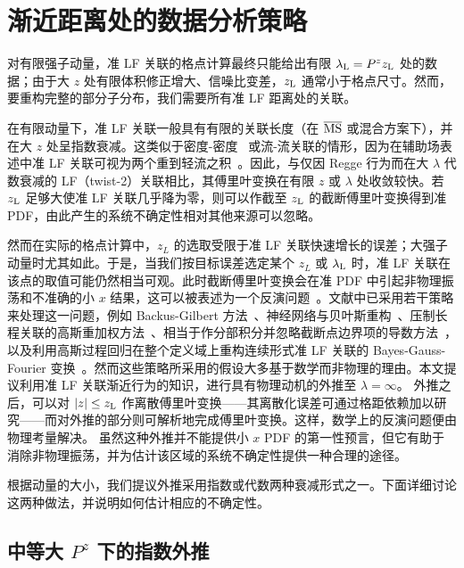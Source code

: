 \section{渐近距离处的数据分析策略}
\label{sec:regge}

对有限强子动量，准 LF 关联的格点计算最终只能给出有限 $\lambda_{\rm L}=P^zz_{\rm L}$ 处的数据；由于大 $z$ 处有限体积修正增大、信噪比变差，$z_{\rm L}$ 通常小于格点尺寸。然而，要重构完整的部分子分布，我们需要所有准 LF 距离处的关联。

在有限动量下，准 LF 关联一般具有有限的关联长度（在 ${\overline{\rm MS}}$ 或混合方案下），并在大 $z$ 处呈指数衰减。这类似于密度-密度~\cite{Burkardt:1994pw} 或流-流关联的情形，因为在辅助场表述中准 LF 关联可视为两个重到轻流之积~\cite{Samuel:1978iy,Gervais:1979fv,Arefeva:1980zd,Dorn:1986dt}。因此，与仅因 Regge 行为而在大 $\lambda$ 代数衰减的 LF（twist-2）关联相比，其傅里叶变换在有限 $z$ 或 $\lambda$ 处收敛较快。若 $z_{\rm L}$ 足够大使准 LF 关联几乎降为零，则可以作截至 $z_{\rm L}$ 的截断傅里叶变换得到准 PDF，由此产生的系统不确定性相对其他来源可以忽略。

然而在实际的格点计算中，$z_L$ 的选取受限于准 LF 关联快速增长的误差；大强子动量时尤其如此。于是，当我们按目标误差选定某个 $z_L$ 或 $\lambda_{\rm L}$ 时，准 LF 关联在该点的取值可能仍然相当可观。此时截断傅里叶变换会在准 PDF 中引起非物理振荡和不准确的小 $x$ 结果，这可以被表述为一个反演问题~\cite{Karpie:2019eiq}。文献中已采用若干策略来处理这一问题，例如 Backus-Gilbert 方法~\cite{Karpie:2019eiq,Bhat:2020ktg}、神经网络与贝叶斯重构~\cite{Karpie:2019eiq}、压制长程关联的高斯重加权方法~\cite{Ishikawa:2019flg}、相当于作分部积分并忽略截断点边界项的导数方法~\cite{Lin:2017ani}，以及利用高斯过程回归在整个定义域上重构连续形式准 LF 关联的 Bayes-Gauss-Fourier 变换~\cite{Alexandrou:2020tqq}。然而这些策略所采用的假设大多基于数学而非物理的理由。本文提议利用准 LF 关联渐近行为的知识，进行具有物理动机的外推至 $\lambda\!=\!\infty$。
外推之后，可以对 $|z|\le z_{\rm L}$ 作离散傅里叶变换——其离散化误差可通过格距依赖加以研究——而对外推的部分则可解析地完成傅里叶变换。这样，数学上的反演问题便由物理考量解决。
虽然这种外推并不能提供小 $x$ PDF 的第一性预言，但它有助于消除非物理振荡，并为估计该区域的系统不确定性提供一种合理的途径。

根据动量的大小，我们提议外推采用指数或代数两种衰减形式之一。下面详细讨论这两种做法，并说明如何估计相应的不确定性。


\subsection{中等大 $P^z$ 下的指数外推}

